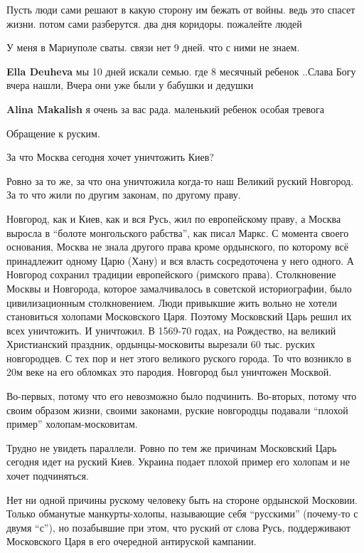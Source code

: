 \begin{itemize}

Пусть люди сами решают в какую сторону им бежать от войны. ведь это спасет
жизни. потом сами разберутся. два дня коридоры. пожалейте людей

У меня в Мариуполе сваты. связи нет 9 дней. что с ними не знаем.

\begin{itemize} %
\textbf{Ella Deuheva} мы 10 дней искали семью. где 8 месячный ребенок ..Слава Богу вчера нашли, Вчера они уже были у бабушки и дедушки

\textbf{Alina Makalish} я очень за вас рада. маленький ребенок особая тревога
\end{itemize} %


Обращение к руским.

За что Москва сегодня хочет уничтожить Киев?

Ровно за то же, за что она уничтожила когда-то наш Великий руский Новгород. За
то что жили по другим законам, по другому праву.

Новгород, как и Киев, как и вся Русь, жил по европейскому праву, а Москва
выросла в \enquote{болоте монгольского рабства}, как писал Маркс. С момента
своего основания, Москва не знала другого права кроме ордынского, по которому
всё принадлежит одному Царю (Хану) и вся власть сосредоточена у него одного. А
Новгород сохранил традиции европейского (римского права). Столкновение Москвы и
Новгорода, которое замалчивалось в советской историографии, было
цивилизационным столкновением. Люди привыкшие жить вольно не хотели становиться
холопами Московского Царя. Поэтому Московский Царь решил их всех уничтожить. И
уничтожил. В 1569-70 годах, на Рождество, на великий Христианский праздник,
ордынцы-московиты вырезали 60 тыс. руских новгородцев. С тех пор и нет этого
великого руского города. То что возникло в 20м веке на его обломках это
пародия. Новгород был уничтожен Москвой.

Во-первых, потому что его невозможно было подчинить. Во-вторых, потому что
своим образом жизни, своими законами, руские новгородцы подавали
\enquote{плохой пример} холопам-московитам.

Трудно не увидеть параллели. Ровно по тем же причинам Московский Царь сегодня
идет на руский Киев. Украина подает плохой пример его холопам и не хочет
подчиняться.

Нет ни одной причины рускому человеку быть на стороне ордынской Московии.
Только обманутые манкурты-холопы, называющие себя \enquote{русскими} (почему-то
с двумя \enquote{с}), но позабывшие при этом, что руский от слова Русь,
поддерживают Московского Царя в его очередной антируской кампании.


\end{itemize}
